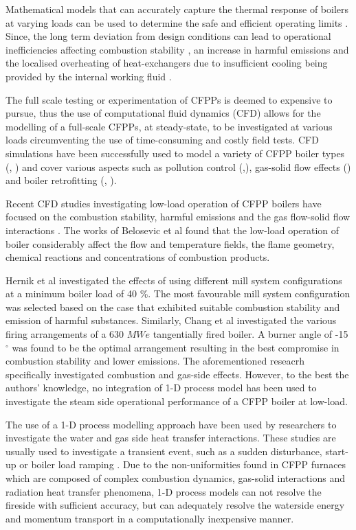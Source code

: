 \documentclass[review]{elsarticle}
\begin{document}
Mathematical models that can accurately capture the thermal response of boilers at varying loads can be used to determine the safe and efficient operating limits \cite{Laubscher2019b}. Since, the long term deviation from design conditions can lead to operational inefficiencies affecting combustion stability \cite{Hernik2020}, an increase in harmful emissions \cite{Chang2021} and the localised overheating of heat-exchangers due to insufficient cooling being provided by the internal working fluid \cite{Modlinski2019}.

The full scale testing or experimentation of CFPPs is deemed to expensive to pursue, thus the use of computational fluid dynamics (CFD) allows for the modelling of a full-scale CFPPs, at steady-state, to be investigated at various loads circumventing the use of time-consuming and costly field tests. CFD simulations have been successfully used to model a variety of CFPP boiler types (\cite{Laubscher2019a}, \cite{Gu2020}) and cover various aspects such as pollution control (\cite{Du2017},\cite{Fan2001}), gas-solid flow effects (\cite{Chen2017}) and boiler retrofitting (\citep{Gu2020}, \cite{He2007}).

Recent CFD studies investigating low-load operation of CFPP boilers have focused on the combustion stability, harmful emissions and the gas flow-solid flow interactions \cite{Jiang2021}. The works of Belosevic et al \citep{Belosevic2019a} found that the low-load operation of boiler considerably affect the flow and temperature fields, the flame geometry, chemical reactions and concentrations of combustion products.

Hernik et al \cite{Hernik2020} investigated the effects of using different mill system configurations at a minimum boiler load of 40 \%. The most favourable mill system configuration was selected based on the case that exhibited suitable combustion stability and emission of harmful substances. Similarly, Chang et al \citep{Chang2021} investigated the various firing arrangements of a 630 $MWe$ tangentially fired boiler. A burner angle of -15 $^\circ$ was found to be the optimal arrangement resulting in the best compromise in combustion stability and lower emissions. The aforementioned reseacrh specifically investigated combustion and gas-side effects. However, to the best the authors' knowledge, no integration of 1-D process model has been used to investigate the steam side operational performance of a CFPP boiler at low-load.

The use of a 1-D process modelling approach have been used by researchers to investigate the water and gas side heat transfer interactions. These studies are usually used to investigate a transient event, such as a sudden disturbance, start-up or boiler load ramping \cite{Alobaid2017}. Due to the non-uniformities found in CFPP furnaces which are composed of complex combustion dynamics, gas-solid interactions and  radiation heat transfer phenomena, 1-D process models can not resolve the fireside with sufficient accuracy, but can adequately resolve the waterside energy and momentum transport in a computationally inexpensive manner. 
\end{document}
